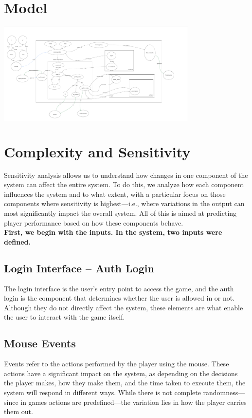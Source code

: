 \documentclass{article}
\begin{document}
\section*{Model}
\begin{center}
    \includegraphics[width=0.75\textwidth]{src/IO.pdf}
  \end{center}

  \section*{Complexity and Sensitivity}
  Sensitivity analysis allows us to understand how changes in one component of the system can affect the entire system. To do this, we analyze how each component influences the system and to what extent, with a particular focus on those components where sensitivity is highest—i.e., where variations in the output can most significantly impact the overall system. All of this is aimed at predicting player performance based on how these components behave.\\
  
  \textbf{First, we begin with the inputs. In the system, two inputs were defined.}
  
  \subsection*{Login Interface – Auth Login}
  The login interface is the user's entry point to access the game, and the auth login is the component that determines whether the user is allowed in or not. Although they do not directly affect the system, these elements are what enable the user to interact with the game itself.
  
  \subsection*{Mouse Events}
  Events refer to the actions performed by the player using the mouse. These actions have a significant impact on the system, as depending on the decisions the player makes, how they make them, and the time taken to execute them, the system will respond in different ways. While there is not complete randomness—since in games actions are predefined—the variation lies in how the player carries them out.
  \\
  
\end{document}
